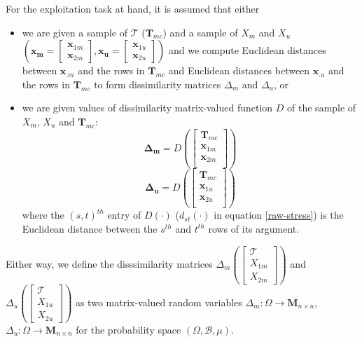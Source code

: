 \documentclass[11pt]{article} %
\begin{document}
For the exploitation task at hand, it is assumed that either
\begin{itemize}
\item  we are given a sample of $\mathcal{T}$ ($\mathbf{T}_{mc}$) and a sample of $X_m$ and  $X_u$ 
$\left(\bm{x_m}=\left[
 \begin{array}{c}
\bm{x}_{1m}\\
\bm{x}_{2m}
\end{array}
\right] ,\bm{x_u}=\left[
 \begin{array}{c}
 \bm{x}_{1u}\\
 \bm{x}_{2u} 
\end{array}
\right]\right)$ 
 and  we compute Euclidean distances between  $\bm{x}_{.m}$ and the rows in  $\mathbf{T}_{mc}$  and Euclidean distances between  $\bm{x}_{.u}$ and the rows in  $\mathbf{T}_{mc}$ to form  dissimilarity matrices $\Delta_m$ and $\Delta_u$, or
\item we are given values of  dissimilarity matrix-valued function $D$ of  the sample of $X_m$, $X_u$ and $\mathbf{T}_{mc}$: $$
\mathbf{\Delta_m} = D \left( \left[
 \begin{array}{c}
\mathbf{T}_{mc}  \\
\bm{x}_{1m}\\
\bm{x}_{2m}\\
\end{array}
\right]
\right)
$$
$$
\mathbf{\Delta_u}=D \left( \left[
 \begin{array}{c}
\mathbf{T}_{mc}  \\
\bm{x}_{1u}\\
\bm{x}_{2u}\\
\end{array}
\right]
\right)
$$
where the  $(s,t)^{th}$ entry of $D(\cdot)$   ($d_{st}(\cdot)$ in equation \eqref{raw-stress})  is the Euclidean distance between the $s^{th}$ and $t^{th}$ rows of its argument.
\end{itemize}

Either way, we define the disssimilarity matrices $\Delta_{m} \left(\left[
\begin{array}{c}
\mathcal{T} \\
X_{1m} \\
X_{2m} 
\end {array}
\right]
\right)$  and 
 $\Delta_{u} \left(\left[
\begin{array}{c}
\mathcal{T}\\
X_{1u} \\
X_{2u}
\end {array}
\right]\right)$ as two matrix-valued random variables $\Delta_{m}:\Omega \rightarrow \mathbf{M}_{n\times n} $,$\Delta_{u}:\Omega \rightarrow \mathbf{M}_{n\times n} $  for the probability space $(\Omega,\mathcal{B},\mu)$.
\end{document}
